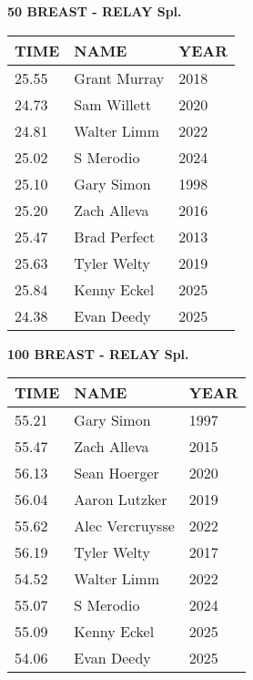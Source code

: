 \vspace{0.4cm}

\begin{center}
\begin{minipage}[t]{0.7\textwidth}
\centering
\textbf{50 BREAST - RELAY Spl.}\\[0.05cm]
\begin{tabular}{@{}p{1.8cm}p{2.8cm}p{1.2cm}@{}}
\hline
\textbf{TIME} & \textbf{NAME} & \textbf{YEAR} \\
\hline
25.55 & Grant Murray & 2018 \\
24.73 & Sam Willett & 2020 \\
24.81 & Walter Limm & 2022 \\
25.02 & S Merodio & 2024 \\
25.10 & Gary Simon & 1998 \\
25.20 & Zach Alleva & 2016 \\
25.47 & Brad Perfect & 2013 \\
25.63 & Tyler Welty & 2019 \\
25.84 & Kenny Eckel & 2025 \\
24.38 & Evan Deedy & 2025 \\
\hline
\end{tabular}
\end{minipage}
\end{center}

\vspace{0.4cm}

\begin{center}
\begin{minipage}[t]{0.7\textwidth}
\centering
\textbf{100 BREAST - RELAY Spl.}\\[0.05cm]
\begin{tabular}{@{}p{1.8cm}p{2.8cm}p{1.2cm}@{}}
\hline
\textbf{TIME} & \textbf{NAME} & \textbf{YEAR} \\
\hline
55.21 & Gary Simon & 1997 \\
55.47 & Zach Alleva & 2015 \\
56.13 & Sean Hoerger & 2020 \\
56.04 & Aaron Lutzker & 2019 \\
55.62 & Alec Vercruysse & 2022 \\
56.19 & Tyler Welty & 2017 \\
54.52 & Walter Limm & 2022 \\
55.07 & S Merodio & 2024 \\
55.09 & Kenny Eckel & 2025 \\
54.06 & Evan Deedy & 2025 \\
\hline
\end{tabular}
\end{minipage}
\end{center}

